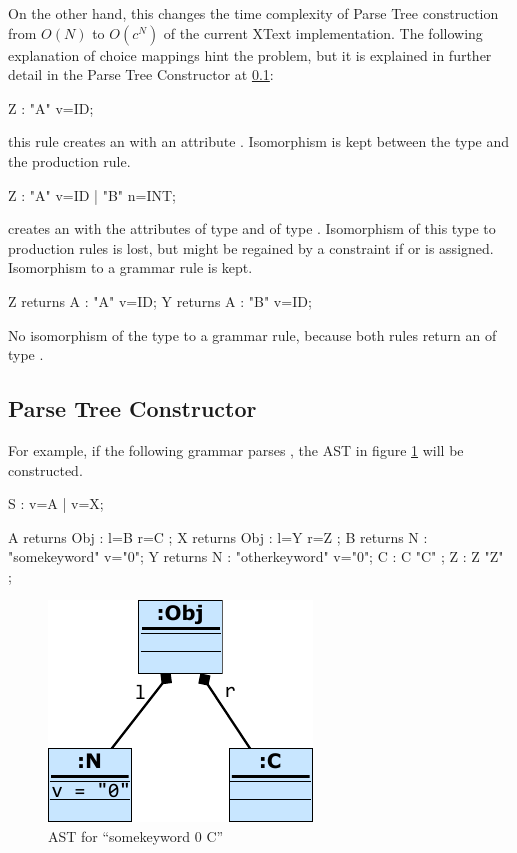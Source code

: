 On the other hand, this changes the time complexity of Parse Tree construction from $O(N)$ to $O(c^N)$ of the current XText implementation. The following explanation of choice mappings hint the problem, but it is explained in further detail in the Parse Tree Constructor at \ref{sub:Xtxt:PTC}: 
\begin{xtxt}
Z 	:  "A" v=ID;
\end{xtxt}
this rule creates an   with an  attribute . Isomorphism is kept between the type  and the production rule.
\begin{xtxt}
Z 	:  "A" v=ID  
	|  "B" n=INT;
	\end{xtxt}
creates an   with the attributes  of type  and  of type .  Isomorphism of this type to production rules is lost, but might be regained by a constraint if  or  is assigned. Isomorphism to a grammar rule is kept.
\begin{xtxt}
Z returns A : "A" v=ID;
Y returns A : "B" v=ID;
\end{xtxt}
No isomorphism of the type  to a grammar rule, because both rules return an  of type .

\subsection{Parse Tree Constructor} \label{sub:Xtxt:PTC}

For example, if the following grammar parses , the AST in figure \ref{AST:CSP} will be constructed.
\begin{xtxt}
S  	:  	v=A 
	| 	v=X;

A returns Obj	: 	l=B r=C   ;
X returns Obj	: 	l=Y r=Z   ;
B returns N  	:  	"somekeyword" 	v="0";
Y returns N  	: 	"otherkeyword" 	v="0";
C 		:  	 {C} "C" ;
Z 		: 	 {Z} "Z" ;
\end{xtxt}


\begin{figure}
\centering
\includegraphics[scale=1.3]{gfx/ex/CSP} 
\caption{AST for ``somekeyword 0 C''}
\label{AST:CSP}
\end{figure}


